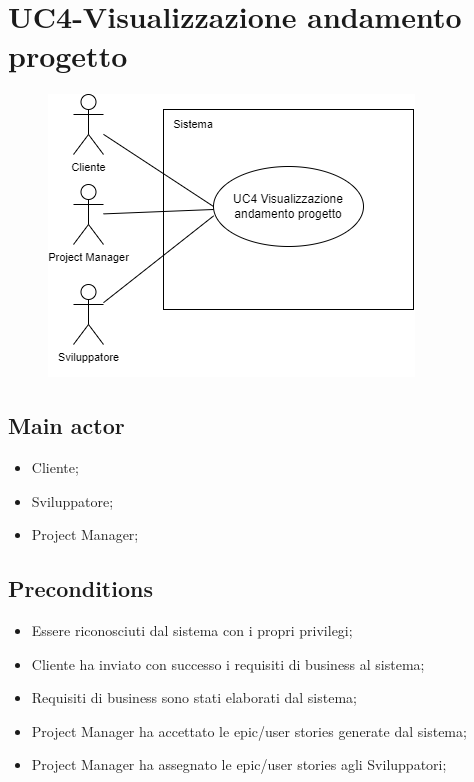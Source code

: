 \documentclass{article}
\begin{document}
\section{UC4-Visualizzazione andamento progetto}
    \begin{figure}[h]
      \centering
      \includegraphics{./imgUML/UC4.png}
      \label{fig:immagine}
    \end{figure}
    
    \subsection*{Main actor}
        \begin{itemize}
            \item Cliente;
            \item Sviluppatore;
            \item Project Manager;
        \end{itemize}
        
    \subsection*{Preconditions}
        \begin{itemize}
            \item Essere riconosciuti dal sistema con i propri privilegi;
            \item Cliente ha inviato con successo i requisiti di business al sistema;
            \item Requisiti di business sono stati elaborati dal sistema;
            \item Project Manager ha accettato le epic/user stories generate dal sistema;
            \item Project Manager ha assegnato le epic/user stories agli Sviluppatori;
        \end{itemize}
        
\end{document}
